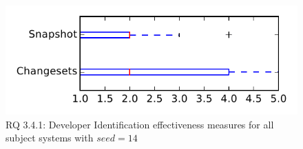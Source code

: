 
\begin{figure}
\centering
\includegraphics[height=0.4\textheight]{figures/dit_seed/rq1_tiny_14}
\caption{RQ 3.4.1: Developer Identification effectiveness measures for all subject systems with $seed=14$}
\label{fig:dit_seed:rq1:tiny}
\end{figure}
